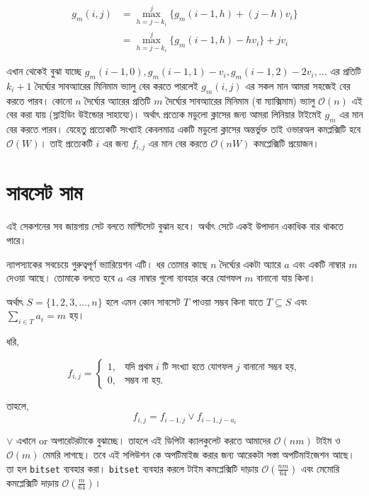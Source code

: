 \begin{align*}
g_m(i, j) & = \max_{h = j - k_{i}}^{j} \lbrace g_{m}(i - 1, h) + (j - h)v_{i} \rbrace \\ 
          & = \max_{h = j - k_{i}}^{j} \lbrace g_{m}(i - 1, h) - hv_{i} \rbrace + jv_{i} 
\end{align*}

এখান থেকেই বুঝা যাচ্ছে \(g_{m}(i - 1, 0), g_{m}(i - 1, 1) - v_{i}, g_{m}(i - 1, 2) - 2v_{i}, \dots\) এর প্রতিটি \(k_{i} + 1\) দৈর্ঘ্যের সাবঅ্যারের মিনিমাম ভ্যালু বের করতে পারলেই  \(g_{m}(i, j)\) এর সকল মান আমরা সহজেই বের করতে পারব। কোনো \(n\) দৈর্ঘ্যের অ্যারের প্রতিটি \(m\) দৈর্ঘ্যের সাবঅ্যারের মিনিমাম (বা ম্যাক্সিমাম) ভ্যালু \(\mathcal{O}(n)\) এই বের করা যায় (স্লাইডিং উইন্ডোর সাহায্যে)। অর্থাৎ প্রত্যেক মডুলো ক্লাসের জন্য আমরা লিনিয়ার টাইমেই \(g_{m}\) এর মান বের করতে পারব। যেহেতু প্রত্যেকটি সংখ্যাই কেবলমাত্র একটি মডুলো ক্লাসের অন্তর্ভুক্ত তাই ওভারঅল কমপ্লক্সিটি হবে \(\mathcal{O}(W)\)। তাই প্রত্যেকটি \(i\) এর জন্য \(f_{i, j}\) এর মান বের করতে \(\mathcal{O}(nW)\) কমপ্লেক্সিটি প্রয়োজন।   

\section{সাবসেট সাম} 
এই সেকশনের সব জায়গায় সেট বলতে মাল্টিসেট বুঝান হবে। অর্থাৎ সেটে একই উপাদান একাধিক বার থাকতে পারে। 

ন্যাপস্যাকের সবচেয়ে গুরুত্বপূর্ণ ভ্যারিয়েশন এটি। ধর তোমার কাছে \(n\) দৈর্ঘ্যের একটা অ্যারে \(a\) এবং একটি নাম্বার \(m\) দেওয়া আছে। তোমাকে বলতে হবে \(a\) এর নাম্বার গুলো ব্যবহার করে যোগফল \(m\) বানানো যায় কিনা।  

অর্থাৎ \(S = \lbrace 1, 2, 3, \dots, n \rbrace\) হলে এমন কোন সাবসেট \(T\) পাওয়া সম্ভব কিনা যাতে \(T \subseteq S\) এবং \(\sum_{i \in T} a_{i} = m\) হয়। 

ধরি, 
 
\[f_{i, j} = \begin{cases}
  1, & \text{যদি প্রথম } i \text{ টি সংখ্যা হতে যোগফল } j \text{ বানানো সম্ভব হয়}, \\
  0, & \text{সম্ভব না হয়}.
\end{cases}\]

তাহলে, 
\[f_{i, j} = f_{i - 1, j} \lor f_{i - 1, j - a_{i}}\]

\(\lor\) এখানে or অপারেটরটাকে বুঝাচ্ছে।  তাহলে এই ডিপিটা ক্যালকুলেট করতে আমাদের \(\mathcal{O}(nm)\) টাইম ও \(\mathcal{O}(m)\) মেমরি লাগছে। তবে এই সলিউশন কে অপটিমাইজ করার জন্য আরেকটা সস্তা অপটিমাইজেশন আছে। তা হল \texttt{bitset} ব্যবহার করা।  \texttt{bitset} ব্যবহার করলে টাইম কমপ্লেক্সিটি দাড়ায় \(\mathcal{O}(\frac{nm}{64})\) এবং মেমোরি কমপ্লেক্সিটি দাড়ায় \(\mathcal{O}(\frac{m}{64})\)। 


